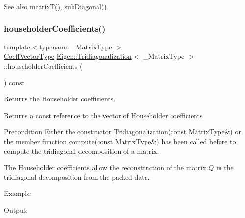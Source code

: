 \begin{DoxySeeAlso}{See also}
\mbox{\hyperlink{class_eigen_1_1_tridiagonalization_a6eb5ef94b8b9bb013c0e69b6df56d0df}{matrix\+T()}}, \mbox{\hyperlink{class_eigen_1_1_tridiagonalization_ac423dbb91157c159bdcb4b5a8371232e}{sub\+Diagonal()}} 
\end{DoxySeeAlso}
\mbox{\label{class_eigen_1_1_tridiagonalization_ac95b4e43dcf6c3c5074b8bea4fc67887}} 
\subsubsection{\texorpdfstring{householderCoefficients()}{householderCoefficients()}}
{\footnotesize\ttfamily template$<$typename \+\_\+\+Matrix\+Type $>$ \\
\mbox{\hyperlink{class_eigen_1_1_matrix}{Coeff\+Vector\+Type}} \mbox{\hyperlink{class_eigen_1_1_tridiagonalization}{Eigen\+::\+Tridiagonalization}}$<$ \+\_\+\+Matrix\+Type $>$\+::householder\+Coefficients (\begin{DoxyParamCaption}{ }\end{DoxyParamCaption}) const\hspace{0.3cm}{\ttfamily [inline]}}



Returns the Householder coefficients. 

\begin{DoxyReturn}{Returns}
a const reference to the vector of Householder coefficients
\end{DoxyReturn}
\begin{DoxyPrecond}{Precondition}
Either the constructor Tridiagonalization(const Matrix\+Type\&) or the member function compute(const Matrix\+Type\&) has been called before to compute the tridiagonal decomposition of a matrix.
\end{DoxyPrecond}
The Householder coefficients allow the reconstruction of the matrix $ Q $ in the tridiagonal decomposition from the packed data.

Example\+: 
\begin{DoxyCodeInclude}{0}
\end{DoxyCodeInclude}
 Output\+: 
\begin{DoxyVerbInclude}
\end{DoxyVerbInclude}


